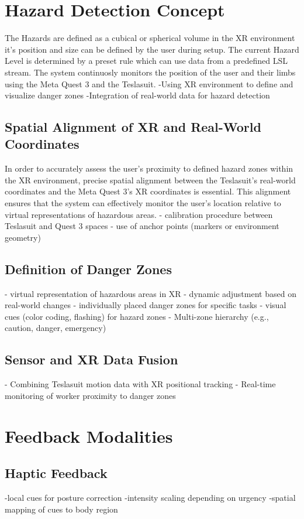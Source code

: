 \section{Hazard Detection Concept}
The Hazards are defined as a cubical or spherical volume in the XR environment it's position and size can be defined by the user during setup. The current Hazard Level is determined by a preset rule which can use data from a predefined LSL stream.
The system continuosly monitors the position of the user and their limbs using the Meta Quest 3 and the Teslasuit. 
-Using XR environment to define and visualize danger zones
-Integration of real-world data for hazard detection

\subsection{Spatial Alignment of XR and Real-World Coordinates}
In order to accurately assess the user's proximity to defined hazard zones within the XR environment, precise spatial alignment between the Teslasuit's real-world coordinates and the Meta Quest 3's XR coordinates is essential. This alignment ensures that the system can effectively monitor the user's location relative to virtual representations of hazardous areas.
- calibration procedure between Teslasuit and Quest 3 spaces
- use of anchor points (markers or environment geometry)

\subsection{Definition of Danger Zones}
- virtual representation of hazardous areas in XR
- dynamic adjustment based on real-world changes
- individually placed danger zones for specific tasks
- visual cues (color coding, flashing) for hazard zones
- Multi-zone hierarchy (e.g., caution, danger, emergency)

\subsection{Sensor and XR Data Fusion}
- Combining Teslasuit motion data with XR positional tracking
- Real-time monitoring of worker proximity to danger zones


\section{Feedback Modalities}
\subsection{Haptic Feedback}
-local cues for posture correction
-intensity scaling depending on urgency
-spatial mapping of cues to body region
